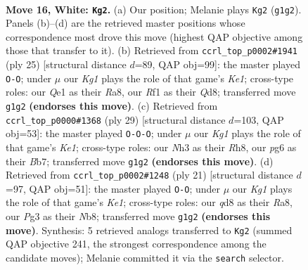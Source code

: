 \documentclass[11pt]{article}
\begin{document}
\clearpage

\begin{figure}[p]\centering
\begin{subfigure}{0.46\textwidth}\centering
\resizebox{\linewidth}{!}{%
\newchessgame
\chessboard[
  setfen={rn1q1rk1/4bp2/5np1/p1p4p/1p1pp2P/1P1P2PN/P1P1PP2/RNB1QRK1 w - - 0 16},
  showmover=false,
  pgfstyle=straightmove, color=movearrow, markmove={g1-g2}
]}
\caption{}
\end{subfigure}\hfill
\begin{subfigure}{0.46\textwidth}\centering
\resizebox{\linewidth}{!}{%
\newchessgame
\chessboard[
  setfen={r2qk2r/pn2npbp/1p2p1p1/1Ppp4/2P1PP2/P1NP2P1/1B2Q2P/R3K1NR b KQkq - 1 13},
  showmover=false,
  pgfstyle=straightmove, color=movearrow, markmove={e8-g8}
]}
\caption{}
\end{subfigure}
\\[4pt]
\begin{subfigure}{0.46\textwidth}\centering
\resizebox{\linewidth}{!}{%
\newchessgame
\chessboard[
  setfen={r3k2r/pb1nq3/1p1pp2p/2p2ppn/2PP4/2P1PP2/P1QNBBPP/R3K2R b KQkq - 1 15},
  showmover=false,
  pgfstyle=straightmove, color=movearrow, markmove={e8-c8}
]}
\caption{}
\end{subfigure}\hfill
\begin{subfigure}{0.46\textwidth}\centering
\resizebox{\linewidth}{!}{%
\newchessgame
\chessboard[
  setfen={rnbqk2r/1p2npbp/p2p2p1/1Pp1p3/P1P1P3/3P1NP1/5PBP/RNBQK2R b KQkq - 0 11},
  showmover=false,
  pgfstyle=straightmove, color=movearrow, markmove={e8-g8}
]}
\caption{}
\end{subfigure}
\caption{\textbf{Move 16, White: \texttt{Kg2}.} (a) Our position; Melanie plays \texttt{Kg2} (\texttt{g1g2}). Panels (b)--(d) are the retrieved master positions whose correspondence most drove this move (highest QAP objective among those that transfer to it). (b) Retrieved from \texttt{ccrl\_top\_p0002\#1941} (ply 25) [structural distance $d$=89, QAP obj=99]: the master played \texttt{O-O}; under $\mu$ our \emph{Kg1} plays the role of that game's \emph{Ke1}; cross-type roles: our \emph{Q}e1 as their \emph{R}a8, our \emph{R}f1 as their \emph{Q}d8; transferred move \texttt{g1g2} \textbf{(endorses this move)}. (c) Retrieved from \texttt{ccrl\_top\_p0000\#1368} (ply 29) [structural distance $d$=103, QAP obj=53]: the master played \texttt{O-O-O}; under $\mu$ our \emph{Kg1} plays the role of that game's \emph{Ke1}; cross-type roles: our \emph{N}h3 as their \emph{R}h8, our \emph{p}g6 as their \emph{B}b7; transferred move \texttt{g1g2} \textbf{(endorses this move)}. (d) Retrieved from \texttt{ccrl\_top\_p0002\#1248} (ply 21) [structural distance $d$=97, QAP obj=51]: the master played \texttt{O-O}; under $\mu$ our \emph{Kg1} plays the role of that game's \emph{Ke1}; cross-type roles: our \emph{q}d8 as their \emph{R}a8, our \emph{P}g3 as their \emph{N}b8; transferred move \texttt{g1g2} \textbf{(endorses this move)}. Synthesis: 5 retrieved analogs transferred to \texttt{Kg2} (summed QAP objective 241, the strongest correspondence among the candidate moves); Melanie committed it via the \texttt{search} selector.}
\label{fig:thought-m30}
\end{figure}
\end{document}

